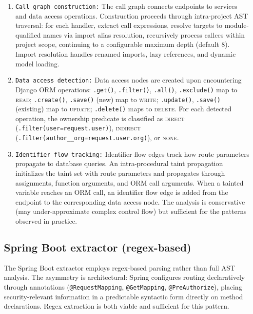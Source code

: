 \begin{enumerate}
\item \texttt{Call graph construction:} The call graph connects endpoints to services and data access operations.
Construction proceeds through intra-project AST traversal: for each handler,
extract call expressions, resolve targets to module-qualified names via
import alias resolution, recursively process callees within project scope,
continuing to a configurable maximum depth (default 8). Import resolution
handles renamed imports, lazy references, and dynamic model loading.

\item \texttt{Data access detection:} Data access nodes are created upon encountering Django ORM operations:
\texttt{.get()}, \texttt{.filter()}, \texttt{.all()}, \texttt{.exclude()}
map to \textsc{read}; \texttt{.create()}, \texttt{.save()} (new) map to
\textsc{write}; \texttt{.update()}, \texttt{.save()} (existing) map to
\textsc{update}; \texttt{.delete()} maps to \textsc{delete}. For each
detected operation, the ownership predicate is classified as \textsc{direct}
(\texttt{.filter(user=request.user)}), \textsc{indirect}
(\texttt{.filter(author\_\_org=request.user.org)}), or \textsc{none}.

\item \texttt{Identifier flow tracking:} Identifier flow edges track how route parameters propagate to database
queries. An intra-procedural taint propagation initializes the taint set
with route parameters and propagates through assignments, function arguments,
and ORM call arguments. When a tainted variable reaches an ORM call, an
identifier flow edge is added from the endpoint to the corresponding data
access node. The analysis is conservative (may under-approximate complex
control flow) but sufficient for the patterns observed in practice.

    
\end{enumerate}

\subsection{Spring Boot extractor (regex-based)}
\label{sec:det-spring}

The Spring Boot extractor employs regex-based parsing rather than full AST
analysis. The asymmetry is architectural: Spring configures routing
declaratively through annotations (\texttt{@Request\-Mapping},
\texttt{@GetMapping}, \texttt{@PreAuthorize}), placing security-relevant
information in a predictable syntactic form directly on method declarations.
Regex extraction is both viable and sufficient for this pattern.

